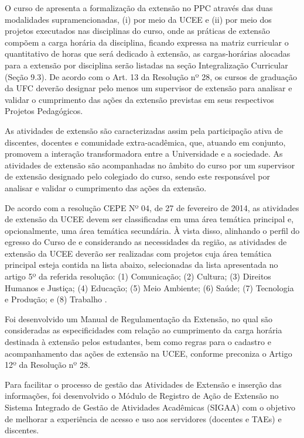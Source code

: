 \vspace{1em}

O curso de \nomedocurso apresenta a formalização da extensão no PPC através das duas modalidades supramencionadas, (i) por meio da UCEE e (ii) por meio dos projetos executados nas disciplinas do curso, onde as práticas de extensão compõem a carga horária da disciplina, ficando expressa na matriz curricular o quantitativo de horas que será dedicado à extensão, as cargas-horárias alocadas para a extensão por disciplina serão listadas na seção Integralização Curricular (Seção 9.3). De acordo com o Art. 13 da Resolução nº 28, os cursos de graduação da UFC deverão designar pelo menos um supervisor de extensão para analisar e validar o cumprimento das ações da extensão previstas em seus respectivos Projetos Pedagógicos.

As atividades de extensão são caracterizadas assim pela participação ativa de discentes, docentes e comunidade extra-acadêmica, que, atuando em conjunto, promovem a interação transformadora entre a Universidade e a sociedade. As atividades de extensão são acompanhadas no âmbito do curso por um supervisor de extensão designado pelo colegiado do curso, sendo este responsável por analisar e validar o cumprimento das ações da extensão.

De acordo com a resolução CEPE Nº 04, de 27 de fevereiro de 2014, as atividades de extensão da UCEE devem ser classificadas em uma área temática principal e, opcionalmente, uma área temática secundária. À vista disso, alinhando o perfil do egresso do Curso de \nomedocurso e considerando as necessidades da região, as atividades de extensão da UCEE deverão ser realizadas com projetos cuja área temática principal esteja contida na lista abaixo, selecionadas da lista apresentada no artigo 5º da referida resolução: (1) Comunicação; (2) Cultura; (3) Direitos Humanos e Justiça; (4) Educação; (5) Meio Ambiente; (6) Saúde; (7) Tecnologia e Produção; e (8) Trabalho \cite{ufc2014resolucao04}.

Foi desenvolvido um  Manual de Regulamentação da Extensão, no qual são consideradas as especificidades com relação ao cumprimento da carga horária destinada à extensão pelos estudantes, bem como regras para o cadastro e acompanhamento das ações de extensão na UCEE, conforme preconiza o Artigo 12º da Resolução nº 28.  %

Para facilitar o processo de gestão das Atividades de Extensão e inserção das informações, foi desenvolvido o Módulo de Registro de Ação de Extensão no Sistema Integrado de Gestão de Atividades Acadêmicas (SIGAA) com o objetivo de melhorar a experiência de acesso e uso aos servidores (docentes e TAEs) e discentes.